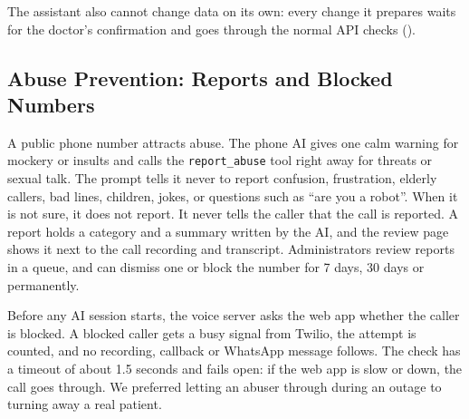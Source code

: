 The assistant also cannot change data on its own: every change it prepares waits for the doctor's confirmation and goes through the normal API checks ().

\subsection{Abuse Prevention: Reports and Blocked Numbers}

A public phone number attracts abuse. The phone AI gives one calm warning for mockery or insults and calls the \texttt{report\_abuse} tool right away for threats or sexual talk. The prompt tells it never to report confusion, frustration, elderly callers, bad lines, children, jokes, or questions such as ``are you a robot''. When it is not sure, it does not report. It never tells the caller that the call is reported. A report holds a category and a summary written by the AI, and the review page shows it next to the call recording and transcript. Administrators review reports in a queue, and can dismiss one or block the number for 7 days, 30 days or permanently.

Before any AI session starts, the voice server asks the web app whether the caller is blocked. A blocked caller gets a busy signal from Twilio, the attempt is counted, and no recording, callback or WhatsApp message follows. The check has a timeout of about 1.5 seconds and fails open: if the web app is slow or down, the call goes through. We preferred letting an abuser through during an outage to turning away a real patient.
